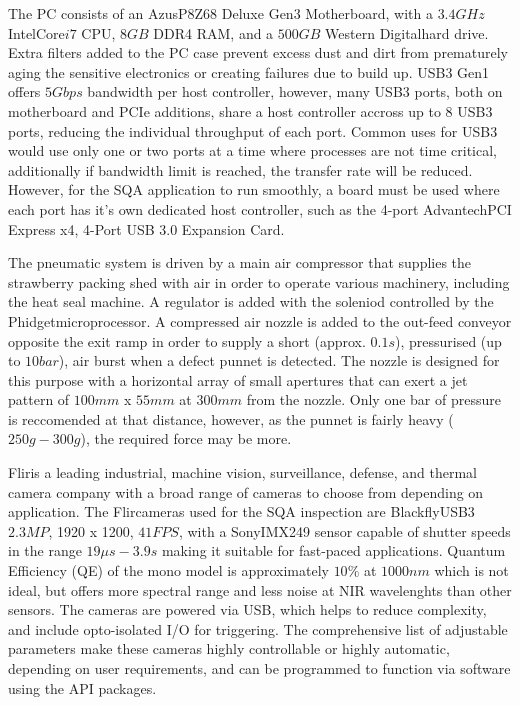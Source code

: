 \documentclass[fleqn,twoside]{article}
\begin{document}
The PC consists of an Azus\textregistered P8Z68 Deluxe Gen3 Motherboard, with a $3.4GHz$ Intel\textregistered Core\texttrademark $i7$ CPU, $8GB$ DDR4 RAM, and a $500GB$ Western Digital\textregistered hard drive. Extra filters added to the PC case prevent excess dust and dirt from prematurely aging the sensitive electronics or creating failures due to build up. USB3 Gen1 offers $5Gbps$ bandwidth per host controller, however, many USB3 ports, both on motherboard and PCIe additions, share a host controller accross up to 8 USB3 ports, reducing the individual throughput of each port. Common uses for USB3 would use only one or two ports at a time where processes are not time critical, additionally if bandwidth limit is reached, the transfer rate will be reduced. However, for the SQA application to run smoothly, a board must be used where each port has it's own dedicated host controller, such as the 4-port Advantech\texttrademark PCI Express x4, 4-Port USB 3.0 Expansion Card. 

The pneumatic system is driven by a main air compressor that supplies the strawberry packing shed with air in order to operate various machinery, including the heat seal machine. A regulator is added with the soleniod controlled by the Phidget\texttrademark microprocessor. A compressed air nozzle is added to the out-feed conveyor opposite the exit ramp in order to supply a short (approx. $0.1s$), pressurised (up to $10bar$), air burst when a defect punnet is detected. The nozzle is designed for this purpose with a horizontal array of small apertures that can exert a jet pattern of $100mm$ x $55mm$ at $300mm$ from the nozzle. Only one bar of pressure is reccomended at that distance, however, as the punnet is fairly heavy ($250g-300g$), the required force may be more.

Flir\textregistered is a leading industrial, machine vision, surveillance, defense, and thermal camera company with a broad range of cameras to choose from depending on application. The Flir\textregistered cameras used for the SQA inspection are Blackfly\textregistered USB3 $2.3 MP$, 1920 x 1200, $41FPS$, with a Sony\textregistered IMX249 sensor capable of shutter speeds in the range $19\mu s-3.9s$ making it suitable for fast-paced applications. Quantum Efficiency (QE) of the mono model is approximately $10\%$ at $1000nm$ which is not ideal, but offers more spectral range and less noise at NIR wavelenghts than other sensors. The cameras are powered via USB, which helps to reduce complexity, and include opto-isolated I/O for triggering. The comprehensive list of adjustable parameters make these cameras highly controllable or highly automatic, depending on user requirements, and can be programmed to function via software using the API packages. 
\end{document}
